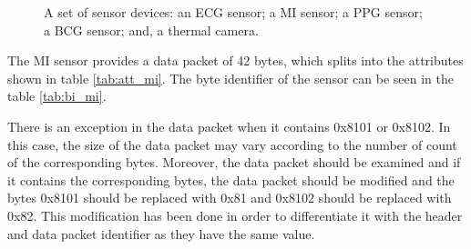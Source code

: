 \begin{figure}
	\hspace{8pt}%
	\caption[A set of sensor devices.]{A set of sensor devices:
		 an ECG sensor;
		 a MI sensor;
		 a PPG sensor;
		 a BCG sensor; and,
		 a thermal camera.}%
	\label{fig:ex3}%
\end{figure}



The MI sensor provides a data packet of 42 bytes, which splits into the attributes shown in table \ref{tab:att_mi}. The byte identifier of the sensor can be seen in the table \ref{tab:bi_mi}.

There is an exception in the data packet when it contains 0x8101 or 0x8102. In this case, the size of the data packet may vary according to the number of count of the corresponding bytes. Moreover, the data packet should be examined and if it contains the corresponding bytes, the data packet should be modified and the bytes 0x8101 should be replaced with 0x81 and 0x8102 should be replaced with 0x82. This modification has been done in order to differentiate it with the header and data packet identifier as they have the same value.


